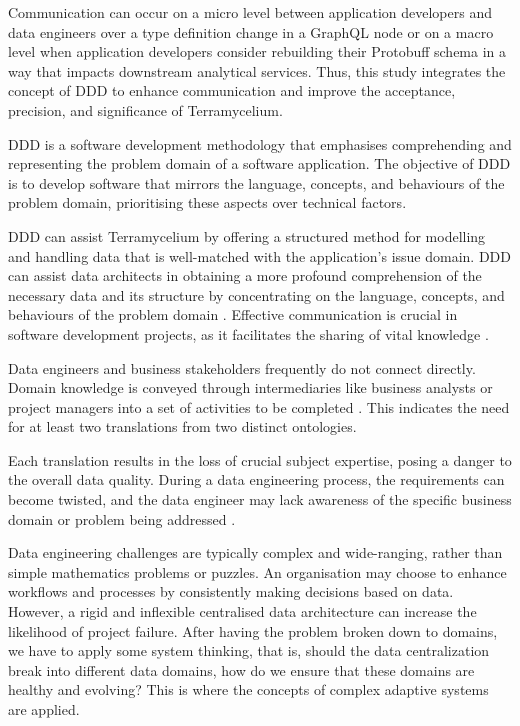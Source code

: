 \documentclass[review]{elsarticle}
\begin{document}
Communication can occur on a micro level between application developers and data engineers over a type definition change in a GraphQL node or on a macro level when application developers consider rebuilding their Protobuff schema in a way that impacts downstream analytical services. Thus, this study integrates the concept of DDD to enhance communication and improve the acceptance, precision, and significance of Terramycelium.

DDD is a software development methodology that emphasises comprehending and representing the problem domain of a software application. The objective of DDD is to develop software that mirrors the language, concepts, and behaviours of the problem domain, prioritising these aspects over technical factors. 

DDD can assist Terramycelium by offering a structured method for modelling and handling data that is well-matched with the application's issue domain. DDD can assist data architects in obtaining a more profound comprehension of the necessary data and its structure by concentrating on the language, concepts, and behaviours of the problem domain \cite{DataMesh}. Effective communication is crucial in software development projects, as it facilitates the sharing of vital knowledge \cite{sudhakar2012model}. 

Data engineers and business stakeholders frequently do not connect directly. Domain knowledge is conveyed through intermediaries like business analysts or project managers into a set of activities to be completed \cite{khrononov2021learning}. This indicates the need for at least two translations from two distinct ontologies.

Each translation results in the loss of crucial subject expertise, posing a danger to the overall data quality. During a data engineering process, the requirements can become twisted, and the data engineer may lack awareness of the specific business domain or problem being addressed \cite{khononov2021learning}.

Data engineering challenges are typically complex and wide-ranging, rather than simple mathematics problems or puzzles. An organisation may choose to enhance workflows and processes by consistently making decisions based on data. However, a rigid and inflexible centralised data architecture can increase the likelihood of project failure. After having the problem broken down to domains, we have to apply some system thinking, that is, should the data centralization break into different data domains, how do we ensure that these domains are healthy and evolving? This is where the concepts of complex adaptive systems are applied.
\end{document}
